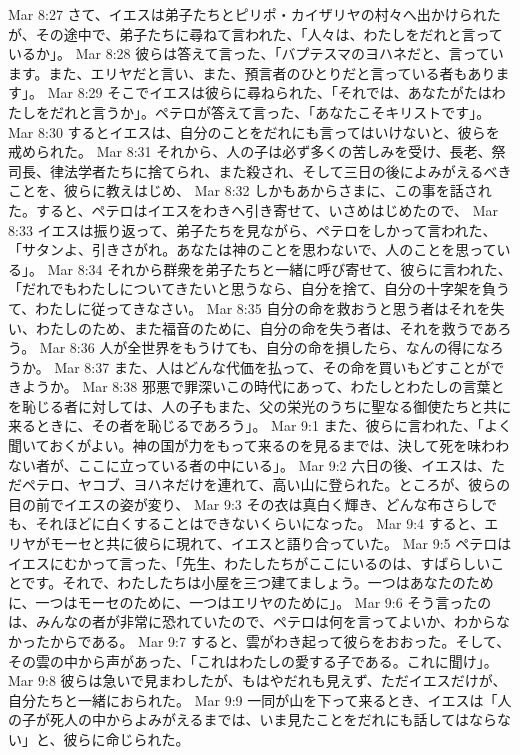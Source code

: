 Mar 8:27  さて、イエスは弟子たちとピリポ・カイザリヤの村々へ出かけられたが、その途中で、弟子たちに尋ねて言われた、「人々は、わたしをだれと言っているか」。
Mar 8:28  彼らは答えて言った、「バプテスマのヨハネだと、言っています。また、エリヤだと言い、また、預言者のひとりだと言っている者もあります」。
Mar 8:29  そこでイエスは彼らに尋ねられた、「それでは、あなたがたはわたしをだれと言うか」。ペテロが答えて言った、「あなたこそキリストです」。
Mar 8:30  するとイエスは、自分のことをだれにも言ってはいけないと、彼らを戒められた。
Mar 8:31  それから、人の子は必ず多くの苦しみを受け、長老、祭司長、律法学者たちに捨てられ、また殺され、そして三日の後によみがえるべきことを、彼らに教えはじめ、
Mar 8:32  しかもあからさまに、この事を話された。すると、ペテロはイエスをわきへ引き寄せて、いさめはじめたので、
Mar 8:33  イエスは振り返って、弟子たちを見ながら、ペテロをしかって言われた、「サタンよ、引きさがれ。あなたは神のことを思わないで、人のことを思っている」。
Mar 8:34  それから群衆を弟子たちと一緒に呼び寄せて、彼らに言われた、「だれでもわたしについてきたいと思うなら、自分を捨て、自分の十字架を負うて、わたしに従ってきなさい。
Mar 8:35  自分の命を救おうと思う者はそれを失い、わたしのため、また福音のために、自分の命を失う者は、それを救うであろう。
Mar 8:36  人が全世界をもうけても、自分の命を損したら、なんの得になろうか。
Mar 8:37  また、人はどんな代価を払って、その命を買いもどすことができようか。
Mar 8:38  邪悪で罪深いこの時代にあって、わたしとわたしの言葉とを恥じる者に対しては、人の子もまた、父の栄光のうちに聖なる御使たちと共に来るときに、その者を恥じるであろう」。
Mar 9:1  また、彼らに言われた、「よく聞いておくがよい。神の国が力をもって来るのを見るまでは、決して死を味わわない者が、ここに立っている者の中にいる」。
Mar 9:2  六日の後、イエスは、ただペテロ、ヤコブ、ヨハネだけを連れて、高い山に登られた。ところが、彼らの目の前でイエスの姿が変り、
Mar 9:3  その衣は真白く輝き、どんな布さらしでも、それほどに白くすることはできないくらいになった。
Mar 9:4  すると、エリヤがモーセと共に彼らに現れて、イエスと語り合っていた。
Mar 9:5  ペテロはイエスにむかって言った、「先生、わたしたちがここにいるのは、すばらしいことです。それで、わたしたちは小屋を三つ建てましょう。一つはあなたのために、一つはモーセのために、一つはエリヤのために」。
Mar 9:6  そう言ったのは、みんなの者が非常に恐れていたので、ペテロは何を言ってよいか、わからなかったからである。
Mar 9:7  すると、雲がわき起って彼らをおおった。そして、その雲の中から声があった、「これはわたしの愛する子である。これに聞け」。
Mar 9:8  彼らは急いで見まわしたが、もはやだれも見えず、ただイエスだけが、自分たちと一緒におられた。
Mar 9:9  一同が山を下って来るとき、イエスは「人の子が死人の中からよみがえるまでは、いま見たことをだれにも話してはならない」と、彼らに命じられた。
